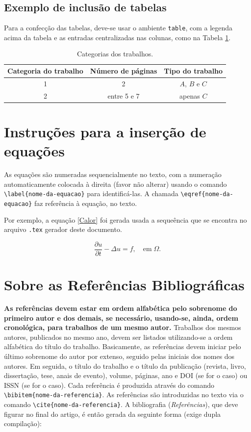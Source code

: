 \documentclass[a4,11pt]{pssbmac}
\begin{document}
\subsection{Exemplo de inclusão de tabelas}

Para a confecção das tabelas, deve-se usar o ambiente \texttt{table}, com a legenda acima da tabela e as entradas centralizadas nas colunas, como na Tabela \ref{tabela01}.

\begin{table}[ht]
\caption{ {\small Categorias dos trabalhos.}}
\centering
\begin{tabular}{ccc}
\toprule
Categoria do trabalho  & Número de páginas & Tipo do trabalho\\ \midrule
1          & 2  & $A$, $B$ e $C$    \\
2          & entre 5 e 7  & apenas $C$ \\
\bottomrule
\end{tabular}\label{tabela01}
\end{table}

\section{Instruções para a inserção de equações}

As equações são numeradas sequencialmente no texto, com a numeração automaticamente colocada à direita (favor não alterar) usando o comando \verb!\label{nome-da-equacao}! para identificá-las. A chamada \verb!\eqref{nome-da-equacao}! faz referência à equação, no texto. 

Por exemplo, a equação \eqref{Calor} foi gerada usada a sequeência que se encontra no arquivo \texttt{.tex} gerador deste documento.

%
\begin{equation}
\frac{\partial u}{\partial t}-\Delta u = f, \quad  \mathrm{em} \; \Omega. \label{Calor}
\end{equation}
%

\section{Sobre as Referências Bibliográficas}\label{sec5}

{\bf As referências devem estar em ordem alfabética pelo sobrenome do primeiro autor e dos demais, se necessário, usando-se, ainda, ordem cronológica, para trabalhos de um mesmo autor.} Trabalhos dos mesmos autores, publicados no mesmo ano, devem ser listados utilizando-se a ordem alfabética do título do trabalho. Basicamente, as referências devem iniciar pelo último sobrenome do autor por extenso, seguido pelas iniciais dos nomes dos autores. Em seguida, o título do trabalho e o título da publicação (revista, livro, dissertação, tese, anais de evento), volume, páginas, ano e DOI (se for o caso) ou ISSN (se for o caso). Cada referência é produzida através do comando  
\verb!\bibitem{nome-da-referencia}!. As referências são introduzidas no texto via o comando \verb!\cite{nome-da-referencia}!. A bibliografia ({\it Referências}), que deve figurar no final do artigo, é então gerada da seguinte forma (exige dupla compilação):
\end{document}
